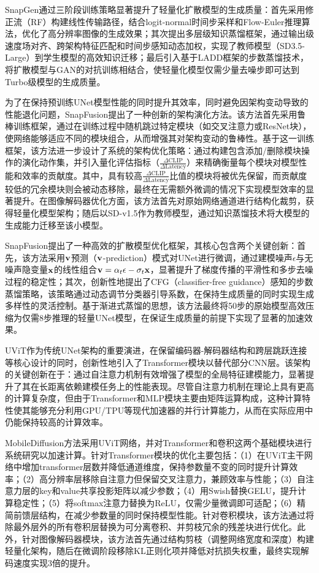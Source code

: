 \documentclass[11pt,a4paper,UTF8]{ctexart}
\begin{document}
SnapGen\cite{hu2024snapgen}通过三阶段训练策略显著提升了轻量化扩散模型的生成质量：首先采用修正流（RF）\cite{liu2022flow}构建线性传输路径，结合logit-normal时间步采样和Flow-Euler推理算法，优化了高分辨率图像的生成效果；其次提出多层级知识蒸馏框架，通过输出级速度场对齐、跨架构特征匹配和时间步感知动态加权，实现了教师模型（SD3.5-Large）到学生模型的高效知识迁移；最后引入基于LADD框架\cite{sauer2024fast}的步数蒸馏技术，将扩散模型与GAN的对抗训练相结合，使轻量化模型仅需少量去噪步即可达到Turbo级模型的生成质量。


为了在保持预训练UNet模型性能的同时提升其效率，同时避免因架构变动导致的性能退化问题，SnapFusion\cite{li2023snapfusion}提出了一种创新的架构演化方法。该方法首先采用鲁棒训练框架，通过在训练过程中随机跳过特定模块（如交叉注意力或ResNet块），使网络能够适应不同的模块组合，从而增强其对架构变动的鲁棒性。基于这一训练框架，该方法进一步设计了系统的架构优化策略：通过构建包含添加/删除模块操作的演化动作集，并引入量化评估指标（$\frac{\Delta\text{CLIP}}{\Delta\text{Latency}}$）来精确衡量每个模块对模型性能和效率的贡献度。其中，具有较高$\frac{\Delta\text{CLIP}}{\Delta\text{Latency}}$比值的模块将被优先保留，而贡献度较低的冗余模块则会被动态移除，最终在无需额外微调的情况下实现模型效率的显著提升。在图像解码器优化方面，该方法首先对原始网络通道进行结构化裁剪，获得轻量化模型架构；随后以SD-v1.5作为教师模型，通过知识蒸馏技术将大模型的生成能力迁移至该小模型。

SnapFusion\cite{li2023snapfusion}提出了一种高效的扩散模型优化框架，其核心包含两个关键创新：首先，该方法采用$\mathbf{v}$预测（$\mathbf{v}$-prediction）模式对UNet进行微调，通过建模噪声$\epsilon$与无噪声隐变量$\mathbf{x}$的线性组合$\mathbf{v}=\alpha_t\epsilon-\sigma_t\mathbf{x}$，显著提升了梯度传播的平滑性和多步去噪过程的稳定性；其次，创新性地提出了CFG（classifier-free guidance）感知的步数蒸馏策略，该策略通过动态调节分类器引导系数，在保持生成质量的同时实现生成多样性的灵活控制。基于渐进式蒸馏的思想，该方法最终将50步的原始模型高效压缩为仅需8步推理的轻量UNet模型，在保证生成质量的前提下实现了显著的加速效果。

UViT\cite{uvit}作为传统UNet架构的重要演进，在保留编码器-解码器结构和跨层跳跃连接等核心设计的同时，创新性地引入了Transformer模块以替代部分CNN层。该架构的关键创新在于：通过自注意力机制有效增强了模型的全局特征建模能力，显著提升了其在长距离依赖建模任务上的性能表现。尽管自注意力机制在理论上具有更高的计算复杂度，但由于Transformer和MLP模块主要由矩阵运算构成，这种计算特性使其能够充分利用GPU/TPU等现代加速器的并行计算能力，从而在实际应用中仍能保持较高的计算效率。

MobileDiffusion\cite{zhao2024mobilediffusion}方法采用UViT网络，并对Transformer和卷积这两个基础模块进行系统研究以加速计算。针对Transformer模块的优化主要包括：（1）在UViT主干网络中增加transformer层数并降低通道维度，保持参数量不变的同时提升计算效率；（2）高分辨率层移除自注意力但保留交叉注意力，兼顾效率与性能；（3）自注意力层的key和value共享投影矩阵以减少参数；（4）用Swish替换GELU，提升计算稳定性；（5）将softmax注意力替换为ReLU，仅需少量微调即可适配；（6）精简前馈层结构，在减少参数量的同时保持模型性能。针对卷积模块，该方法通过将除最外层外的所有卷积层替换为可分离卷积\cite{howard2017mobilenets}、并剪枝冗余的残差块进行优化。此外，针对图像解码器模块，该方法首先通过结构剪枝（调整网络宽度和深度）构建轻量化架构，随后在微调阶段移除KL正则化项并降低对抗损失权重，最终实现解码速度实现3倍的提升。
\end{document}
